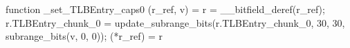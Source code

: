 function _set_TLBEntry_caps0 (r_ref, v) = {
    r = __bitfield_deref(r_ref);
    r.TLBEntry_chunk_0 = update_subrange_bits(r.TLBEntry_chunk_0, 30, 30, subrange_bits(v, 0, 0));
    (*r_ref) = r
}
